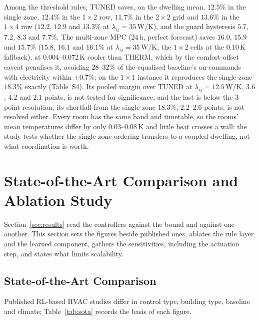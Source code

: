 \documentclass[3p,twocolumn,number]{elsarticle}
\newcommand{\lij}{\lambda_{ij}}
\begin{document}
Among the threshold rules, TUNED saves, on the dwelling mean, $12.5\%$ in the single zone, $12.4\%$ in the $1\times2$ row, $11.7\%$ in the $2\times2$ grid and $13.6\%$ in the $1\times4$ row ($12.2$, $12.9$ and $13.3\%$ at $\lij=35\,$W/K), and the guard hysteresis $5.7$, $7.2$, $8.3$ and $7.7\%$. The multi-zone MPC ($24\,$h, perfect forecast) saves $16.0$, $15.9$ and $15.7\%$ ($15.8$, $16.1$ and $16.1\%$ at $\lij=35\,$W/K; the $1\times2$ cells at the $0.10\,$K fallback), at $0.004$--$0.072\,$K cooler than THERM, which by the comfort-offset caveat penalises it, avoiding $28$--$32\%$ of the equalised baseline's on-commands with electricity within $\pm0.7\%$; on the $1\times1$ instance it reproduces the single-zone $18.3\%$ exactly (Table~S4). Its pooled margin over TUNED at $\lij=12.5\,$W/K, $3.6$, $4.2$ and $2.1$ points, is not tested for significance, and the last is below the $3$-point resolution; its shortfall from the single-zone $18.3\%$, $2.2$--$2.6$ points, is not resolved either. Every room has the same band and timetable, so the rooms' mean temperatures differ by only $0.03$--$0.08\,$K and little heat crosses a wall: the study tests whether the single-zone ordering transfers to a coupled dwelling, not what coordination is worth.

\section{State-of-the-Art Comparison and Ablation Study}
\label{sec:analysis}

Section~\ref{sec:results} read the controllers against the bound and against one another. This section sets the figures beside published ones, ablates the rule layer and the learned component, gathers the sensitivities, including the actuation step, and states what limits scalability.

\subsection{State-of-the-Art Comparison}
\label{subsec:sota}

Published RL-based HVAC studies differ in control type, building type, baseline and climate; Table~\ref{tab:sota} records the basis of each figure.
\end{document}

